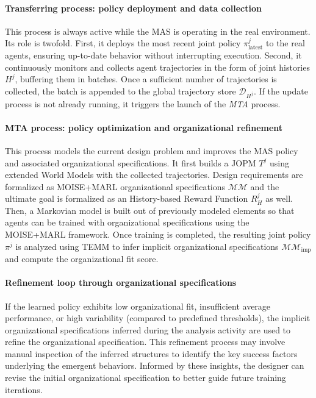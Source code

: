 \paragraph{Transferring process: policy deployment and data collection}

This process is always active while the MAS is operating in the real environment. Its role is twofold. First, it deploys the most recent joint policy $\pi^j_{\text{latest}}$ to the real agents, ensuring up-to-date behavior without interrupting execution. Second, it continuously monitors and collects agent trajectories in the form of joint histories $H^j$, buffering them in batches. Once a sufficient number of trajectories is collected, the batch is appended to the global trajectory store $\mathcal{D}_{H^j}$. If the update process is not already running, it triggers the launch of the \textit{MTA} process.

\paragraph{MTA process: policy optimization and organizational refinement}

This process models the current design problem and improves the MAS policy and associated organizational specifications. It first builds a JOPM $T^j$ using extended World Models with the collected trajectories. Design requirements are formalized as MOISE+MARL organizational specifications $\mathcal{MM}$ and the ultimate goal is formalized as an History-based Reward Function $R^j_H$ as well.
%
Then, a Markovian model is built out of previously modeled elements so that agents can be trained with organizational specifications using the MOISE+MARL framework. Once training is completed, the resulting joint policy $\pi^j$ is analyzed using TEMM to infer implicit organizational specifications $\mathcal{MM}_{\text{imp}}$ and compute the organizational fit score.

\paragraph{Refinement loop through organizational specifications}

If the learned policy exhibits low organizational fit, insufficient average performance, or high variability (compared to predefined thresholds), the implicit organizational specifications inferred during the analysis activity are used to refine the organizational specification. This refinement process may involve manual inspection of the inferred structures to identify the key success factors underlying the emergent behaviors. Informed by these insights, the designer can revise the initial organizational specification to better guide future training iterations.

